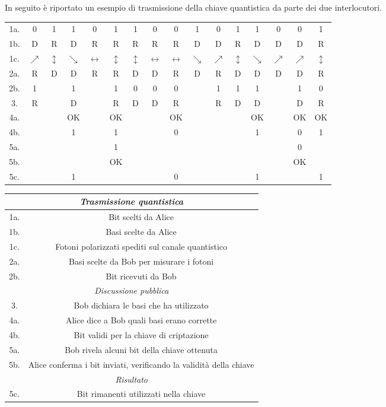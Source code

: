 \documentclass[italian,A4,12pt]{article}
\begin{document}
    In seguito è riportato un esempio di trasmissione della chiave quantistica da parte dei due interlocutori.
    \begin{center}
    \begin{tabular}{| c | c c c c c c c c c c c c c c c |}
      \hline
     1a.& 0 & 1 & 1 & 0 & 1 & 1 & 0 & 0 & 1 & 0 & 1 & 1 & 0 & 0 & 1\\
     1b.&D & R & D & R & R & R & R & R  & D & D & R & D & D & D & R\\
     1c. & $\nearrow$ & $\updownarrow$&$\searrow$ &$\leftrightarrow$ & $\updownarrow$& $\updownarrow$& $\leftrightarrow$&$\leftrightarrow$ & $\searrow$& $\nearrow$&$\updownarrow$&$\searrow$&$\nearrow$ & $\nearrow$ & $\updownarrow$ \\
     2a. & R&D&D&R&R&D&D&R&D&R&D&D&D&D&R\\
     2b. &1& &1& &1&0&0&0&&1&1&1&&1&0\\
     3. & R&&D&&R&D&D&R&&R&D&D&&D&R\\
     4a. &&&OK&&OK&&&OK&&&&OK&&OK&OK\\
     4b. &&&1&&1&&&0&&&&1&&0&1\\
     5a.&&&&&1&&&&&&&&&0&\\
     5b.&&&&&OK&&&&&&&&&OK&\\
     5c. &&&1&&&&&0&&&&1&&&1\\
      \hline
     \end{tabular}
    \end{center}

    \begin{center}
    \begin{tabular}{|c | c|}
      \hline
      \multicolumn{2}{|c|}{\textit{Trasmissione quantistica} }\\
      \hline
      1a.& Bit scelti da Alice\\
      1b.&Basi scelte da Alice\\
      1c. & Fotoni polarizzati spediti sul canale quantistico\\
      2a.& Basi scelte da Bob per misurare i fotoni\\
      2b.&Bit ricevuti da Bob\\
      \hline
      \multicolumn{2}{|c|}{\textit{Discussione pubblica}}\\
      \hline
      3. & Bob dichiara le basi che ha utilizzato\\
      4a.  & Alice dice a Bob quali basi erano corrette \\
      4b. & Bit validi per la chiave di criptazione\\
      5a. &Bob rivela alcuni bit della chiave ottenuta\\
      5b. & Alice conferma i bit inviati, verificando la validità della chiave\\
      \hline
      \multicolumn{2}{|c|}{\textit{Risultato}}\\
      \hline
      5c.& Bit rimanenti utilizzati nella chiave\\
      \hline
    \end{tabular}
    \end{center}
    ~
\end{document}
